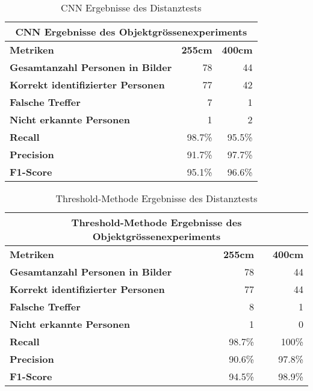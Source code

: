 {
	\renewcommand{\arraystretch}{1.3}
	\begin{table}[H]
		\scriptsize
		\centering
		\begin{tabularx}{.6\textwidth}{Xrr}
			\hline
			\multicolumn{3}{c}{\textbf{CNN Ergebnisse des Objektgrössenexperiments}}\\
			\hline
			\textbf{Metriken} & \textbf{255cm} & \textbf{400cm}\\
			\hline
			\textbf{Gesamtanzahl Personen in Bilder} & 78 & 44 \\
			\hline
			\textbf{Korrekt identifizierter Personen} & 77 & 42\\
			\hline
			\textbf{Falsche Treffer} & 7 & 1\\
			\hline
			\textbf{Nicht erkannte Personen} & 1 & 2\\
			\hline
			\textbf{Recall} & 98.7\% & 95.5\%\\
			\hline  
			\textbf{Precision} & 91.7\% & 97.7\%\\
			\hline
			\textbf{F1-Score} & 95.1\% & 96.6\%\\
			\hline
		\end{tabularx}
		\caption{CNN Ergebnisse des Distanztests}
		\label{tbl:objectSizeCNN}
	\end{table}
	\begin{table}[H]
		\scriptsize
		\centering
		\begin{tabularx}{.6\textwidth}{Xrr}
			\hline
			\multicolumn{3}{c}{\textbf{Threshold-Methode Ergebnisse des Objektgrössenexperiments}}\\
			\hline
			\textbf{Metriken} & \textbf{255cm} & \textbf{400cm}\\
			\hline
			\textbf{Gesamtanzahl Personen in Bilder} & 78 & 44 \\
			\hline
			\textbf{Korrekt identifizierter Personen} & 77 & 44\\
			\hline
			\textbf{Falsche Treffer} & 8 & 1\\
			\hline
			\textbf{Nicht erkannte Personen} & 1 & 0\\
			\hline
			\textbf{Recall} & 98.7\% & 100\%\\
			\hline  
			\textbf{Precision} & 90.6\% & 97.8\%\\
			\hline
			\textbf{F1-Score} & 94.5\% & 98.9\%\\
			\hline
		\end{tabularx}
		\caption{Threshold-Methode Ergebnisse des Distanztests}
		\label{tbl:objectSizeThresh}
	\end{table}
}


